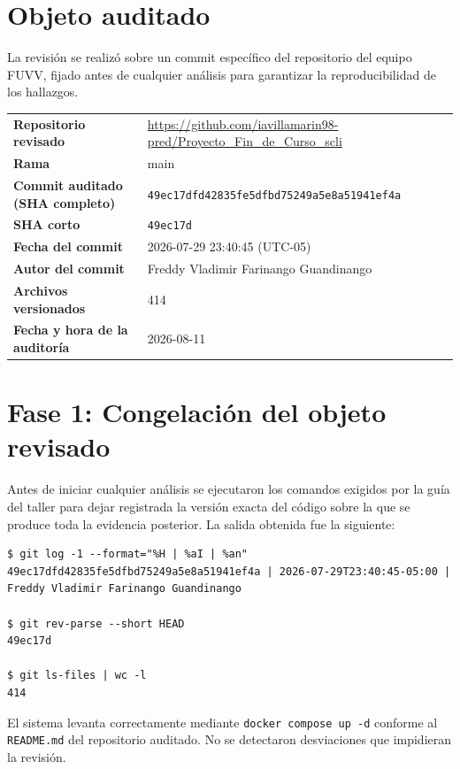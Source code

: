 \documentclass[11pt,a4paper]{article}
\begin{document}
\section{Objeto auditado}

La revisión se realizó sobre un commit específico del repositorio del equipo FUVV,
fijado antes de cualquier análisis para garantizar la reproducibilidad de los
hallazgos.

\begin{center}
\begin{tabular}{l l}
\toprule
\textbf{Repositorio revisado} & \url{https://github.com/iavillamarin98-pred/Proyecto_Fin_de_Curso_scli} \\
\textbf{Rama} & main \\
\textbf{Commit auditado (SHA completo)} & \texttt{49ec17dfd42835fe5dfbd75249a5e8a51941ef4a} \\
\textbf{SHA corto} & \texttt{49ec17d} \\
\textbf{Fecha del commit} & 2026-07-29 23:40:45 (UTC-05) \\
\textbf{Autor del commit} & Freddy Vladimir Farinango Guandinango \\
\textbf{Archivos versionados} & 414 \\
\textbf{Fecha y hora de la auditoría} & 2026-08-11 \\
\bottomrule
\end{tabular}
\end{center}

\section{Fase 1: Congelación del objeto revisado}

Antes de iniciar cualquier análisis se ejecutaron los comandos exigidos por la
guía del taller para dejar registrada la versión exacta del código sobre la que
se produce toda la evidencia posterior. La salida obtenida fue la siguiente:

\begin{verbatim}
$ git log -1 --format="%H | %aI | %an"
49ec17dfd42835fe5dfbd75249a5e8a51941ef4a | 2026-07-29T23:40:45-05:00 |
Freddy Vladimir Farinango Guandinango

$ git rev-parse --short HEAD
49ec17d

$ git ls-files | wc -l
414
\end{verbatim}

El sistema levanta correctamente mediante \texttt{docker compose up -d}
conforme al \texttt{README.md} del repositorio auditado. No se detectaron
desviaciones que impidieran la revisión.
\end{document}
